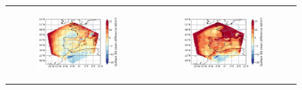 \begin{figure}[htbp]
\begin{tabular}{cc}
        \begin{subfigure}[b]{0.33\textwidth}
            \caption{}
            \includegraphics[width=\textwidth]{images/chap4/forcing_sampling_freq/diff_map_SWdnSFC_era_era.png}
        \end{subfigure} &
        \begin{subfigure}[b]{0.33\textwidth}
            \caption{}
            \includegraphics[width=\textwidth]{images/chap4/forcing_sampling_freq/diff_map_SWdnSFC_ico_era.png}
        \end{subfigure}\\
        

\end{tabular}
\end{figure}
